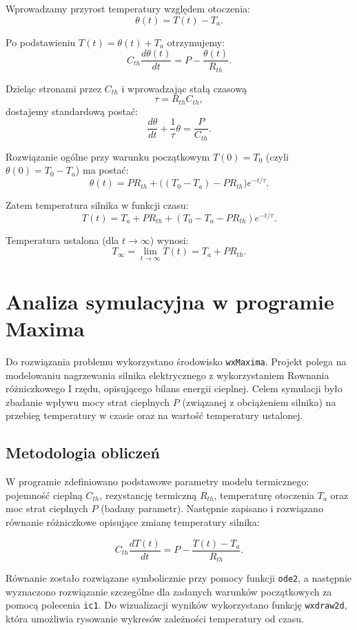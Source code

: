 \documentclass[a4paper,12pt]{article}
\begin{document}
	Wprowadzamy przyrost temperatury względem otoczenia:
	\[
	\theta(t) = T(t) - T_a.
	\]
	
	Po podstawieniu $T(t)=\theta(t)+T_a$ otrzymujemy:
	\[
	C_{th}\frac{d\theta(t)}{dt} = P - \frac{\theta(t)}{R_{th}}.
	\]
	
	Dzieląc stronami przez $C_{th}$ i wprowadzając stałą czasową
	\[
	\tau = R_{th}C_{th},
	\]
	dostajemy standardową postać:
	\[
	\frac{d\theta}{dt} + \frac{1}{\tau}\theta = \frac{P}{C_{th}}.
	\]
	
	Rozwiązanie ogólne przy warunku początkowym $T(0)=T_0$ (czyli $\theta(0)=T_0-T_a$)
	ma postać:
	\[
	\theta(t)=PR_{th} + \bigl((T_0-T_a)-PR_{th}\bigr)e^{-t/\tau}.
	\]
	
	Zatem temperatura silnika w funkcji czasu:
	\[
	T(t)=T_a+PR_{th} + (T_0-T_a-PR_{th})e^{-t/\tau}.
	\]
	
	Temperatura ustalona (dla $t\to\infty$) wynosi:
	\[
	T_{\infty}=\lim_{t\to\infty}T(t)=T_a+PR_{th}.
	\]
	
	
	\newpage
	\section{Analiza symulacyjna w programie Maxima}
	
	Do rozwiązania problemu wykorzystano środowisko \texttt{wxMaxima}. 
	Projekt polega na modelowaniu nagrzewania silnika elektrycznego z wykorzystaniem
	Rownania różniczkowego I rzędu, opisującego bilans energii cieplnej.
	Celem symulacji było zbadanie wpływu mocy strat cieplnych $P$ (związanej z obciążeniem silnika)
	na przebieg temperatury w czasie oraz na wartość temperatury ustalonej.
	
	\subsection{Metodologia obliczeń}
	
	W programie zdefiniowano podstawowe parametry modelu termicznego:
	pojemność cieplną $C_{th}$, rezystancję termiczną $R_{th}$, temperaturę otoczenia $T_a$
	oraz moc strat cieplnych $P$ (badany parametr).
	Następnie zapisano i rozwiązano równanie różniczkowe opisujące zmianę temperatury silnika:
	
	\[
	C_{th}\frac{dT(t)}{dt} = P - \frac{T(t)-T_a}{R_{th}}.
	\]
	
	Równanie zostało rozwiązane symbolicznie przy pomocy funkcji \texttt{ode2},
	a następnie wyznaczono rozwiązanie szczególne dla zadanych warunków początkowych
	za pomocą polecenia \texttt{ic1}.  
	Do wizualizacji wyników wykorzystano funkcję \texttt{wxdraw2d}, która umożliwia
	rysowanie wykresów zależności temperatury od czasu.
	
\end{document}
